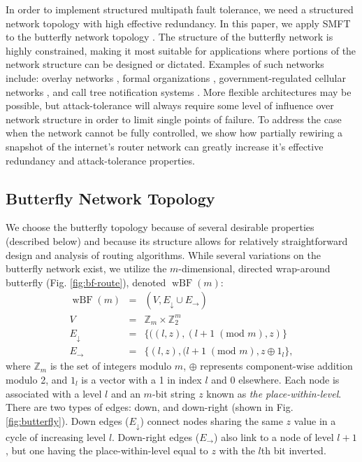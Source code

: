 \documentclass[10pt,letterpaper]{article}
\newcommand{\beq}{\begin{eqnarray}}
\newcommand{\eeq}{\end{eqnarray}}
\DeclareMathOperator{\wbf}{wBF}
\begin{document}
In order to implement structured multipath fault tolerance,
we need a structured network topology with high effective redundancy.
In this paper, we apply SMFT to the butterfly network topology
\cite{kshemkalyani_distributed_2008}.
The structure of the butterfly network is highly constrained,
making it most suitable for applications where portions of the
network structure can be designed or dictated.
Examples of such networks include:
overlay networks \cite{lua_survey_2005, korzun_structured_2013},
formal organizations \cite{mohr_explaining_1982},
government-regulated cellular networks \cite{walker_mass_2012},
and call tree notification systems \cite{nickerson_thinking_2010}.
More flexible architectures may be possible,
but attack-tolerance will always require some level of influence over
network structure in order to limit single points of failure.
To address the case when the network cannot be fully controlled,
we show how partially rewiring a snapshot of the internet's router
network can greatly increase it's effective redundancy and
attack-tolerance properties.

\subsection*{Butterfly Network Topology}

We choose the butterfly topology
\cite{kshemkalyani_distributed_2008}
because of several desirable properties (described below)
and because its structure allows for relatively straightforward
design and analysis of routing algorithms.
While several variations on the butterfly network exist,
we utilize the $m$-dimensional, directed wrap-around butterfly
(Fig. \ref{fig:bf-route}),
denoted $\wbf(m)$:
\beq
\wbf(m) &=& (V, E_\downarrow \cup E_\rightarrow) \\
V &=& \mathbb{Z}_{m} \times \mathbb{Z}_2^m \\
E_\downarrow
&=&
\{((l,z),(l+1 \; (\text{mod } m),z) \} \\
E_\rightarrow
&=&
\{(l,z),(l+1 \; (\text{mod } m),
z \oplus 1_l \},
\eeq
where $\mathbb{Z}_m$ is the set of integers modulo $m$,
$\oplus$ represents component-wise addition modulo 2,
and $1_l$ is a vector with a 1 in index $l$ and 0 elsewhere.
Each node is associated with a level $l$ and an $m$-bit string $z$
known as {\em the place-within-level}.
There are two types of edges: down, and down-right
(shown in Fig. \ref{fig:butterfly}).
Down edges ($E_\downarrow$) connect nodes sharing the same $z$ value
in a cycle of increasing level $l$.
Down-right edges ($E_\rightarrow$) also link to a node of level $l + 1$,
but one having the place-within-level equal to $z$ with the $l$th bit inverted.
\end{document}
